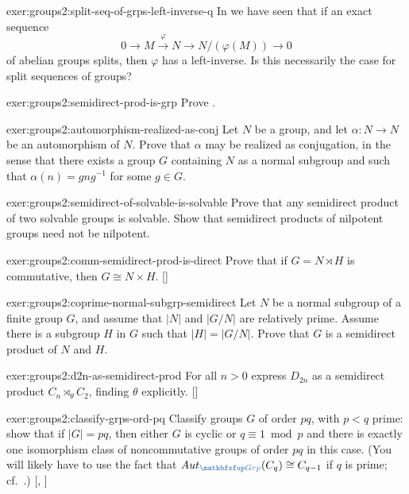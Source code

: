 \begin{exer}{}{exer:groups2:split-seq-of-grps-left-inverse-q}
  In  we have seen that if an exact
  sequence
  \[0 \longrightarrow M \xrightarrow{\varphi} N \longrightarrow
    N/(\varphi(M)) \longrightarrow 0\] of abelian groups splits, then
  $\varphi$ has a left-inverse. Is this necessarily the case for split
  sequences of groups?
\end{exer}
\begin{exer}{}{exer:groups2:semidirect-prod-is-grp}
  Prove .
\end{exer}
\begin{exer}{}{exer:groups2:automorphism-realized-as-conj}
  Let $N$ be a group, and let $\alpha : N \to N$ be an automorphism of
  $N$. Prove that $\alpha$ may be realized as conjugation, in the
  sense that there exists a group $G$ containing $N$ as a normal
  subgroup and such that $\alpha(n) = gng^{-1}$ for some $g \in G$.
\end{exer}
\begin{exer}{}{exer:groups2:semidirect-of-solvable-is-solvable}
  Prove that any semidirect product of two solvable groups is
  solvable.  Show that semidirect products of nilpotent groups need
  not be nilpotent.
\end{exer}
\begin{exer}{}{exer:groups2:comm-semidirect-prod-is-direct}
  \exerused{} Prove that if $G = N \rtimes H$ is commutative, then
  $G \cong N \times
  H$. []
\end{exer}
\begin{exer}{}{exer:groups2:coprime-normal-subgrp-semidirect}
  Let $N$ be a normal subgroup of a finite group $G$, and assume that
  $|N|$ and $|G/N|$ are relatively prime. Assume there is a subgroup
  $H$ in $G$ such that $|H| = |G/N|$. Prove that $G$ is a semidirect
  product of $N$ and $H$.
\end{exer}
\begin{exer}{}{exer:groups2:d2n-as-semidirect-prod}
  \exerused{} For all $n > 0$ express $D_{2n}$ as a semidirect product
  $C_n \rtimes_\theta C_2$, finding $\theta$
  explicitly. []
\end{exer}
\begin{exer}{}{exer:groups2:classify-grps-ord-pq}
  \exerused{} Classify groups $G$ of order $pq$, with $p < q$ prime:
  show that if $|G| = pq$, then either $G$ is cyclic or
  $q \equiv 1 \bmod p$ and there is exactly one isomorphism class of
  noncommutative groups of order $pq$ in this case. (You will likely
  have to use the fact that $\Aut_{\categ{Grp}}(C_q) \cong C_{q-1}$ if
  $q$ is prime; cf.\ .) [,
  ]
\end{exer}
